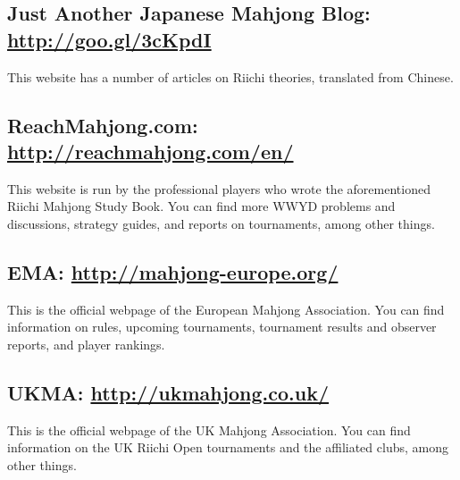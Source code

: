 \subsection*{Just Another Japanese Mahjong Blog: \\\url{http://goo.gl/3cKpdI}}
This website has a number of articles on Riichi theories, translated from Chinese.

\subsection*{ReachMahjong.com: \url{http://reachmahjong.com/en/}}
This website is run by the professional players who wrote the aforementioned Riichi Mahjong Study Book. You can find more WWYD problems and discussions, strategy guides, and reports on tournaments, among other things.

\subsection*{EMA: \url{http://mahjong-europe.org/}} 
This is the official webpage of the European Mahjong Association. You can find information on rules, upcoming tournaments, tournament results and observer reports, and player rankings.

\subsection*{UKMA: \url{http://ukmahjong.co.uk/}} 
This is the official webpage of the UK Mahjong Association. You can find information on the UK Riichi Open tournaments and the affiliated clubs, among other things.

